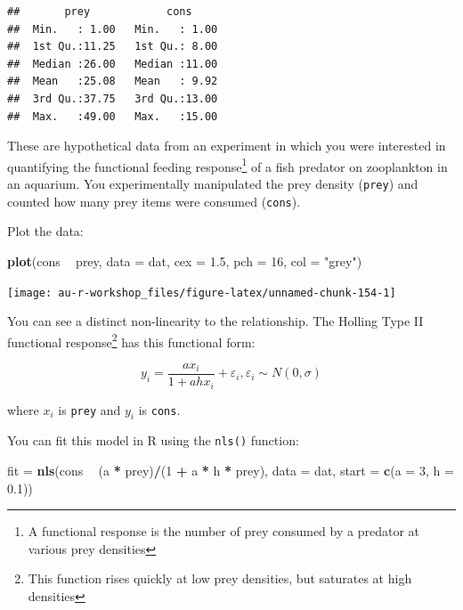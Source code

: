 \documentclass[]{book}
\newenvironment{Shaded}{\begin{snugshade}}{\end{snugshade}}
\newcommand{\DataTypeTok}[1]{\textcolor[rgb]{0.13,0.29,0.53}{#1}}
\newcommand{\DecValTok}[1]{\textcolor[rgb]{0.00,0.00,0.81}{#1}}
\newcommand{\FloatTok}[1]{\textcolor[rgb]{0.00,0.00,0.81}{#1}}
\newcommand{\KeywordTok}[1]{\textcolor[rgb]{0.13,0.29,0.53}{\textbf{#1}}}
\newcommand{\NormalTok}[1]{#1}
\newcommand{\OperatorTok}[1]{\textcolor[rgb]{0.81,0.36,0.00}{\textbf{#1}}}
\newcommand{\StringTok}[1]{\textcolor[rgb]{0.31,0.60,0.02}{#1}}
\let\rmarkdownfootnote\footnote%
\def\footnote{\protect\rmarkdownfootnote}
\begin{document}
\begin{verbatim}
##       prey            cons      
##  Min.   : 1.00   Min.   : 1.00  
##  1st Qu.:11.25   1st Qu.: 8.00  
##  Median :26.00   Median :11.00  
##  Mean   :25.08   Mean   : 9.92  
##  3rd Qu.:37.75   3rd Qu.:13.00  
##  Max.   :49.00   Max.   :15.00
\end{verbatim}

These are hypothetical data from an experiment in which you were interested in quantifying the functional feeding response\footnote{A functional response is the number of prey consumed by a predator at various prey densities} of a fish predator on zooplankton in an aquarium. You experimentally manipulated the prey density (\texttt{prey}) and counted how many prey items were consumed (\texttt{cons}).

Plot the data:

\begin{Shaded}
\begin{Highlighting}[]
\KeywordTok{plot}\NormalTok{(cons }\OperatorTok{~}\StringTok{ }\NormalTok{prey, }\DataTypeTok{data =}\NormalTok{ dat, }\DataTypeTok{cex =} \FloatTok{1.5}\NormalTok{, }\DataTypeTok{pch =} \DecValTok{16}\NormalTok{, }\DataTypeTok{col =} \StringTok{"grey"}\NormalTok{)}
\end{Highlighting}
\end{Shaded}

\begin{center}\texttt{[image: au-r-workshop\_files/figure-latex/unnamed-chunk-154-1]} \end{center}

You can see a distinct non-linearity to the relationship. The Holling Type II functional response\footnote{This function rises quickly at low prey densities, but saturates at high densities} has this functional form:

\begin{equation}
  y_i=\frac{ax_i}{1+ahx_i} + \varepsilon_i, \varepsilon_i \sim N(0, \sigma)
\label{eq:func-resp}
\end{equation}

where \(x_i\) is \texttt{prey} and \(y_i\) is \texttt{cons}.

You can fit this model in R using the \texttt{nls()} function:

\begin{Shaded}
\begin{Highlighting}[]
\NormalTok{fit =}\StringTok{ }\KeywordTok{nls}\NormalTok{(cons }\OperatorTok{~}\StringTok{ }\NormalTok{(a }\OperatorTok{*}\StringTok{ }\NormalTok{prey)}\OperatorTok{/}\NormalTok{(}\DecValTok{1} \OperatorTok{+}\StringTok{ }\NormalTok{a }\OperatorTok{*}\StringTok{ }\NormalTok{h }\OperatorTok{*}\StringTok{ }\NormalTok{prey), }\DataTypeTok{data =}\NormalTok{ dat,}
          \DataTypeTok{start =} \KeywordTok{c}\NormalTok{(}\DataTypeTok{a =} \DecValTok{3}\NormalTok{, }\DataTypeTok{h =} \FloatTok{0.1}\NormalTok{))}
\end{Highlighting}
\end{Shaded}
\end{document}
